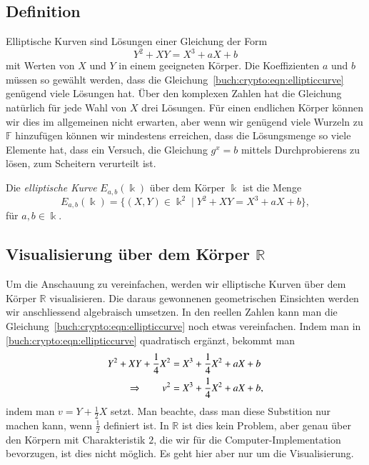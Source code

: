 \subsection{Definition}
Elliptische Kurven sind Lösungen einer Gleichung der Form
\begin{equation}
Y^2+XY=X^3+aX+b
\label{buch:crypto:eqn:ellipticcurve}
\end{equation}
mit Werten von $X$ und $Y$ in einem geeigneten Körper.
Die Koeffizienten $a$ und $b$ müssen so gewählt werden, dass die
Gleichung~\eqref{buch:crypto:eqn:ellipticcurve} genügend viele
Lösungen hat.
Über den komplexen Zahlen hat die Gleichung natürlich für jede Wahl von
$X$ drei Lösungen.
Für einen endlichen Körper können wir dies im allgemeinen nicht erwarten,
aber wenn wir genügend viele Wurzeln zu $\mathbb{F}$ hinzufügen können wir
mindestens erreichen, dass die Lösungsmenge so viele Elemente hat, 
dass ein Versuch, die Gleichung $g^x=b$ mittels Durchprobierens zu
lösen, zum Scheitern verurteilt ist.

\begin{definition}
\label{buch:crypto:def:ellipticcurve}
Die {\em elliptische Kurve} $E_{a,b}(\Bbbk)$ über dem Körper $\Bbbk$ ist 
%
die Menge
\[
E_{a,b}(\Bbbk)
=
\{(X,Y)\in\Bbbk^2\;|\;Y^2+XY=X^3+aX+b\},
\]
für $a,b\in\Bbbk$.
\end{definition}

\subsection{Visualisierung über dem Körper $\mathbb{R}$}
Um die Anschauung zu vereinfachen, werden wir elliptische Kurven über
dem Körper $\mathbb{R}$ visualisieren.
Die daraus gewonnenen geometrischen Einsichten werden wir anschliessend
algebraisch umsetzen.
In den reellen Zahlen kann man die
Gleichung~\eqref{buch:crypto:eqn:ellipticcurve}
noch etwas vereinfachen.
Indem man in \eqref{buch:crypto:eqn:ellipticcurve} 
quadratisch ergänzt, bekommt man
\begin{align}
Y^2 + XY + \frac14X^2 &= X^3+\frac14 X^2 +aX+b
\notag
\\
\Rightarrow\qquad
v^2&=X^3+\frac14X^2+aX+b,
\label{buch:crypto:eqn:ell2}
\end{align}
indem man $v=Y+\frac12X$ setzt.
Man beachte, dass man diese Substition nur machen kann, wenn $\frac12$
definiert ist.
In $\mathbb{R}$ ist dies kein Problem, aber genau über den Körpern
mit Charakteristik $2$, die wir für die Computer-Implementation
bevorzugen, ist dies nicht möglich.
Es geht hier aber nur um die Visualisierung.

